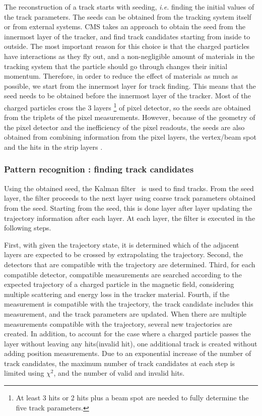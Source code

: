 The reconstruction of a track starts with seeding, \textit{i.e.} 
finding the initial values of the track parameters. 
The seeds can be obtained from the tracking system itself or from external systems.  
CMS takes an approach to obtain the seed from the innermost layer 
of the tracker, and find track candidates starting from inside to outside. 
The most important reason for this choice is that the 
charged particles have interactions as they fly out,
and a non-negligible amount of materials in the tracking system 
that the particle should go through changes their initial momentum.
Therefore, in order to reduce the effect of materials as much as possible, 
we start from the innermost layer for track finding. 
This means that the seed needs to be obtained before the innermost 
layer of the tracker. Most of the charged particles cross the 3 layers 
\footnote{At least 3 hits or 2 hits plus a beam spot are needed to 
fully determine the five track parameters.}
of pixel detector, so the seeds are obtained from the triplets of the 
pixel measurements. 
However, because of the geometry of the pixel detector 
and the inefficiency of the pixel readouts, 
the seeds are also obtained from combining information from the pixel layers, 
the vertex/beam spot and the hits in the strip layers \cite{cmstdr1}.   

\subsubsection{Pattern recognition : finding track candidates}

Using the obtained seed, the Kalman filter~\cite{Fruhwirth1996189} 
is used to find tracks. 
From the seed layer, the filter proceeds to the next layer using coarse 
track parameters obtained from the seed. Starting from the seed, this is done 
layer after layer updating the trajectory information after each layer. 
At each layer, the filter is executed in the following steps. 

First, with given the trajectory state, 
it is determined which of the adjacent layers are expected 
to be crossed by extrapolating the trajectory. Second, the detectors 
that are compatible with the trajectory are determined. Third, 
for each compatible detector, compatible measurements are searched 
according to the expected trajectory of a charged particle in the magnetic field, 
considering multiple scattering and energy loss in the tracker material.
Fourth, if the measurement is compatible 
with the trajectory, the track candidate includes this measurement, 
and the track parameters are updated. When there are multiple measurements
compatible with the trajectory, several new trajectories are 
created. In addition, to account for the case where a charged particle 
passes the layer without leaving any hits(invalid hit), 
one additional track is created without adding position measurements.  
Due to an exponential increase of the number of track candidates, 
the maximum number of track candidates at each step is limited 
using $\chi^2$, and the number of valid and invalid hits. 

